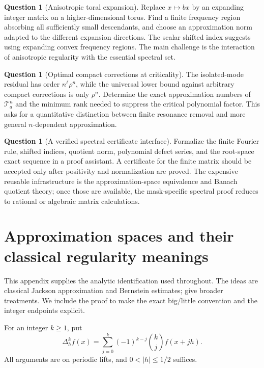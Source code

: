 \documentclass[11pt,a4paper]{article}
\numberwithin{equation}{section}
\theoremstyle{definition}
\newtheorem{question}[theorem]{Question}
\theoremstyle{remark}
\newcommand{\Ta}{\mathcal T_a}
\begin{document}
\begin{question}[Anisotropic toral expansion]
Replace $x\mapsto bx$ by an expanding integer matrix on a higher-dimensional
torus. Find a finite frequency region absorbing all sufficiently small
descendants, and choose an approximation norm adapted to the different
expansion directions. The scalar shifted index suggests using expanding
convex frequency regions. The main challenge is the interaction of
anisotropic regularity with the essential spectral set.
\end{question}

\begin{question}[Optimal compact corrections at criticality]
The isolated-mode residual has order $n^\ell\rho^n$, while the
universal lower bound against arbitrary compact corrections is only
$\rho^n$. Determine the exact approximation numbers of $\Ta^n$ and
the minimum rank needed to suppress the critical polynomial factor.
This asks for a quantitative distinction between finite resonance
removal and more general $n$-dependent approximation.
\end{question}

\begin{question}[A verified spectral certificate interface]
Formalize the finite Fourier rule, shifted indices, quotient norm,
polynomial defect series, and the root-space exact sequence in a proof
assistant. A certificate for the finite matrix should be accepted only
after positivity and normalization are proved. The expensive reusable
infrastructure is the approximation-space equivalence and Banach
quotient theory; once those are available, the mask-specific spectral
proof reduces to rational or algebraic matrix calculations.
\end{question}

\appendix
\section{Approximation spaces and their classical regularity meanings}
\label{app:approximation}

This appendix supplies the analytic identification used throughout.
The ideas are classical Jackson approximation and Bernstein estimates;
\cite{foucart,devore} give broader treatments. We include the proof to
make the exact big/little convention and the integer endpoints explicit.

For an integer $k\ge1$, put
\begin{equation}
 \Delta_h^k f(x)=\sum_{j=0}^k(-1)^{k-j}\binom kj f(x+jh).
 \label{eq:finite-difference}
\end{equation}
All arguments are on periodic lifts, and $0<|h|\le1/2$ suffices.
\end{document}
